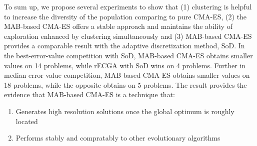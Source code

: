 To sum up, we propose several experiments to show that (1) clustering is
helpful to increase the diversity of the population comparing to pure
CMA-ES, (2) the MAB-based CMA-ES offers a stable approach and maintains
the ability of exploration enhanced by clustering simultaneously and
(3) MAB-based CMA-ES provides a comparable result with the adaptive
discretization method, SoD.
In the best-error-value competition with SoD, MAB-based CMA-ES obtains
smaller values on 14 problems, while rECGA with SoD wins on 4
problems.
Further in median-error-value competition, MAB-based CMA-ES obtains
smaller values on 18 problems, while the opposite obtains on 5 problems.
The result provides the evidence that MAB-based CMA-ES is a technique
that:
\begin{enumerate}
\item{Generates high resolution solutions once the global optimum is
  roughly located}
\item{Performs stably and compratably to other evolutionary algorithms}
  \end{enumerate}

